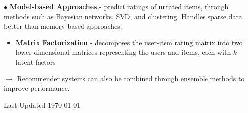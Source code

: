 \documentclass[letterpaper, 10.5pt,landscape]{article}
\makeatletter
\renewcommand{\section}{\@startsection{section}{1}{0mm}%
                                {-1ex plus -.5ex minus -.2ex}%
                                {0.1ex plus .2ex}%
                                {\normalfont\small}}
\makeatother
\begin{document}
\begin{multicols*}{3}
$\bullet$ \textbf{Model-based Approaches} - predict ratings of unrated items, through methods such as Bayesian networks, SVD, and clustering. Handles sparse data better than memory-based approaches.
\begin{itemize}[label={--},leftmargin=4mm]
\vspace{-3pt}
\item \textbf{Matrix Factorization} - decomposes the user-item rating matrix into two lower-dimensional matrices representing the users and items, each with $k$ latent factors
\end{itemize}



$\rightarrow$ Recommender systems can also be combined through ensemble methods to improve performance.


\vspace*{\fill}




\nocite{LSTM_languageModeling} 
\nocite{LSTMwind}
\nocite{analog-dialogue}
\nocite{deeplearning-ai-nlp}
\nocite{kaggle-nlp-pipelines}
\nocite{bobade2016survey}
\nocite{beakta2015big}
\nocite{edureka-hadoop-questions}
\nocite{edureka-mapreduce-tutorial}


\printbibliography




















\vspace*{\fill}


\begin{center}
    Last Updated \today
\end{center}


\end{multicols*}

% 
\end{document}

